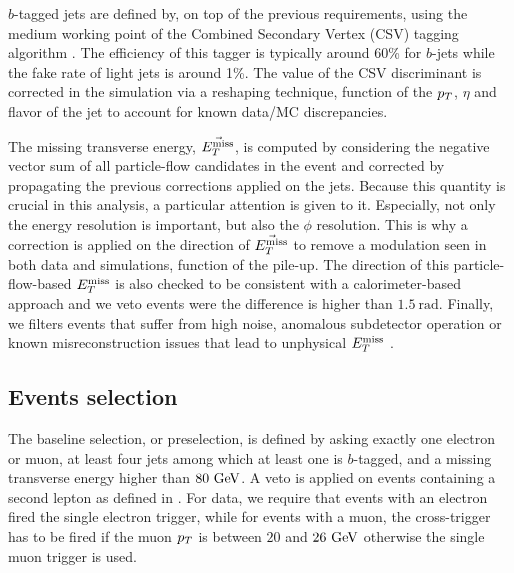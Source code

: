        $b$-tagged jets are defined by, on top of the previous requirements, using the
       medium working point of the Combined Secondary Vertex (CSV) tagging algorithm \cite{bTaggingPerf8TeV}.
       The efficiency of this tagger is typically around 60\% for $b$-jets while the fake
       rate of light jets is around 1\%. The value of the CSV discriminant is corrected in
       the simulation via a reshaping technique, function of the $p_T$, $\eta$ and flavor
       of the jet to account for known data/MC discrepancies.

       The missing transverse energy, $\vec{E_T^\text{miss}}$, is computed by considering the
       negative vector sum of all particle-flow candidates in the event and corrected by
       propagating the previous corrections applied on the jets. Because this quantity is
       crucial in this analysis, a particular attention is given to it. Especially, not only
       the energy resolution is important, but also the $\phi$ resolution. This is why
       a correction is applied on the direction of $\vec{E_T^\text{miss}}$ to remove a modulation seen in
       both data and simulations, function of the pile-up. The direction of this
       particle-flow-based $E_T^\text{miss}$ is also checked to be consistent with a calorimeter-based
       approach and we veto events were the difference is higher than $1.5~\text{rad}$.
       Finally, we filters events that suffer from high noise, anomalous subdetector operation
       or known misreconstruction issues that lead to unphysical $E_T^\text{miss}$ \cite{METperf8TeV}.

        \subsection{Events selection}

        The baseline selection, or preselection,
        is defined by asking exactly one electron or muon, at least
        four jets among which at least one is $b$-tagged, and a missing transverse energy higher than $80 ~\text{GeV}$.
        A veto is applied on events containing a second lepton as defined in .
        For data, we require that events with an electron fired the single electron
        trigger, while for events with a muon, the cross-trigger has to be fired
        if the muon $p_T$ is between $20$ and $26~\text{GeV}$ otherwise the single muon trigger
        is used.

